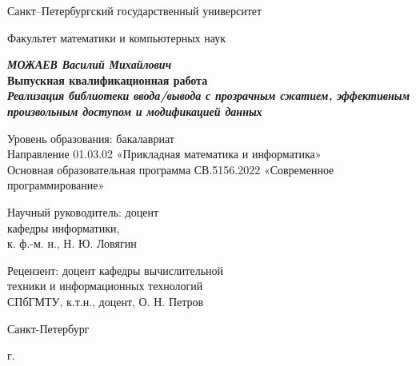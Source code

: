 
\begin{titlepage}
\begin{center}

Санкт--Петербургский государственный университет

Факультет математики и компьютерных наук

\vspace{35mm}

\textbf{\textit{\large МОЖАЕВ Василий Михайлович}} \\[8mm]
\textbf{\large Выпускная квалификационная работа}\\[3mm]
\textbf{\textit{\large Реализация библиотеки ввода/вывода с прозрачным сжатием, эффективным произвольным доступом и модификацией данных}}

\vspace{20mm}
Уровень образования: бакалавриат\\
Направление 01.03.02 «Прикладная математика и информатика»\\
Основная образовательная программа СВ.5156.2022
«Современное программирование»\\[25mm]

\begin{flushright}
\begin{minipage}[t]{0.65\textwidth}
{Научный руководитель:} доцент \\
кафедры информатики, \\
к. ф.-м. н., Н. Ю. Ловягин

\vspace{10mm}

{Рецензент:} доцент кафедры вычислительной \\
техники и информационных технологий \\
СПбГМТУ, к.т.н., доцент, О. Н. Петров

\end{minipage}
\end{flushright}

\vfill 

{Санкт-Петербург}
\par{\the\year{} г.}

\end{center}
\end{titlepage}

\restoregeometry
\addtocounter{page}{1}
